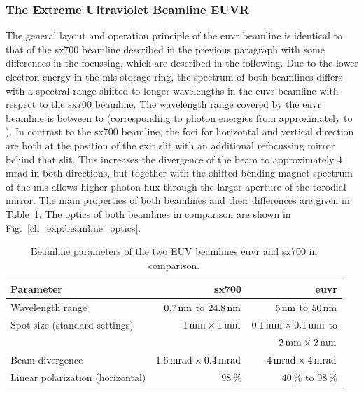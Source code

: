 \subsubsection{The Extreme Ultraviolet Beamline EUVR}
The general layout and operation principle of the \gls{euvr} beamline is identical to that of the \gls{sx700} beamline described in the previous paragraph with some differences in the focussing, which are described in the following. Due to the lower electron energy in the \gls{mls} storage ring, the spectrum of both beamlines differs with a spectral range shifted to longer wavelengths in the \gls{euvr} beamline with respect to the \gls{sx700} beamline. The wavelength range covered by the \gls{euvr} beamline is between  to  (corresponding to photon energies from approximately  to ). In contrast to the \gls{sx700} beamline, the foci for horizontal and vertical direction are both at the position of the exit slit with an additional refocussing mirror behind that slit. This increases the divergence of the beam to approximately $4$ mrad in both directions, but together with the shifted bending magnet spectrum of the \gls{mls} allows higher photon flux through the larger aperture of the torodial mirror. The main properties of both beamlines and their differences are given in Table~\ref{ch_exp:tbl_beamline_properties}. The optics of both beamlines in comparison are shown in Fig.~\ref{ch_exp:beamline_optics}.
\begin{table}
\centering
\begin{tabular}{lrr}
\toprule
Parameter 			& \gls{sx700} 		& \gls{euvr}\\ \midrule
Wavelength range 		& $\nm{0.7}$ to $\nm{24.8}$ 	& $\nm{5}$ to $\nm{50}$\\
Spot size (standard settings)			& $\mm{1} \times \mm{1}$ 		& $\mm{0.1} \times \mm{0.1}$ to\\ 
&&$\mm{2} \times \mm{2}$\\
Beam divergence			& $\SI{1.6}{\milli\radian}\times \SI{0.4}{\milli\radian}$ 	& $\SI{4}{\milli\radian}\times \SI{4}{\milli\radian}$\\
Linear polarization (horizontal)	& $\SI{98}{\percent}$ 		& $\SI{40}{\percent}$ to $\SI{98}{\percent}$\\
 \bottomrule
\end{tabular}
\caption{Beamline parameters of the two EUV beamlines \gls{euvr} and {sx700} in comparison.}
\label{ch_exp:tbl_beamline_properties}
\end{table}
